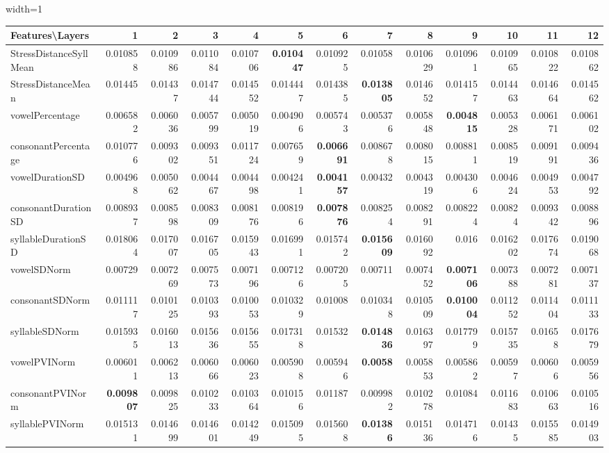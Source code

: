 \documentclass[sigconf]{acmart}
\newcommand{\wv}{wav2vec2.0\xspace}
\begin{document}
\begin{table*}[]
\begin{adjustbox}{width=1\textwidth}
\begin{tabular}{@{}l|rrrrrrrrrrrr@{}}
\toprule
\textbf{Features\textbackslash{}Layers} & 1 & 2 & 3 & 4 & 5 & 6 & 7 & 8 & 9 & 10 & 11 & 12 \\ \midrule
StressDistanceSyllMean & 0.010858 & 0.010986 & 0.011084 & 0.010706 & \textbf{0.010447} & 0.010925 & 0.01058 & 0.010629 & 0.010961 & 0.010965 & 0.010822 & 0.010862 \\
StressDistanceMean & 0.01445 & 0.01437 & 0.014744 & 0.014552 & 0.014447 & 0.014385 & \textbf{0.013805} & 0.014652 & 0.014157 & 0.014463 & 0.014664 & 0.014562 \\
vowelPercentage & 0.006582 & 0.006036 & 0.005799 & 0.005019 & 0.004906 & 0.005743 & 0.005376 & 0.005848 & \textbf{0.004815} & 0.005328 & 0.006171 & 0.006102 \\
consonantPercentage & 0.010776 & 0.009302 & 0.009351 & 0.011724 & 0.007659 & \textbf{0.006691} & 0.008678 & 0.008015 & 0.008811 & 0.008519 & 0.009191 & 0.009436 \\
vowelDurationSD & 0.004968 & 0.005062 & 0.004467 & 0.004498 & 0.004241 & \textbf{0.004157} & 0.00432 & 0.004319 & 0.004306 & 0.004624 & 0.004953 & 0.004792 \\
consonantDurationSD & 0.008937 & 0.008598 & 0.008309 & 0.008176 & 0.008196 & \textbf{0.007876} & 0.008254 & 0.008291 & 0.008224 & 0.00824 & 0.009342 & 0.008896 \\
syllableDurationSD & 0.018064 & 0.017007 & 0.016705 & 0.015943 & 0.016991 & 0.015742 & \textbf{0.015609} & 0.016092 & 0.016 & 0.016202 & 0.017674 & 0.019068 \\
vowelSDNorm & 0.00729 & 0.007269 & 0.007573 & 0.007196 & 0.007126 & 0.007205 & 0.00711 & 0.007452 & \textbf{0.007106} & 0.007388 & 0.007281 & 0.007137 \\
consonantSDNorm & 0.011117 & 0.010125 & 0.010393 & 0.010053 & 0.010329 & 0.01008 & 0.010348 & 0.010509 & \textbf{0.010004} & 0.011252 & 0.011404 & 0.011133 \\
syllableSDNorm & 0.015935 & 0.016013 & 0.015636 & 0.015655 & 0.017318 & 0.01532 & \textbf{0.014836} & 0.016397 & 0.017799 & 0.015735 & 0.01658 & 0.017679 \\
vowelPVINorm & 0.006011 & 0.006213 & 0.006066 & 0.006023 & 0.005908 & 0.005946 & \textbf{0.0058} & 0.005853 & 0.005862 & 0.00597 & 0.00606 & 0.005956 \\
consonantPVINorm & \textbf{0.009807} & 0.009825 & 0.010233 & 0.010364 & 0.010156 & 0.01187 & 0.009982 & 0.010278 & 0.01084 & 0.011683 & 0.010663 & 0.010516 \\
syllablePVINorm & 0.015131 & 0.014699 & 0.014601 & 0.014249 & 0.015095 & 0.015608 & \textbf{0.01386} & 0.015136 & 0.014716 & 0.01435 & 0.015585 & 0.014903 \\ \bottomrule
\end{tabular}
\end{adjustbox}
\vspace{1 mm}
\caption{\label{nPron_W} \small  Results (MSE) for pronunciation features on {\wv} for non-native read speech corpus (L2 Arctic)}

\end{table*}
\end{document}
